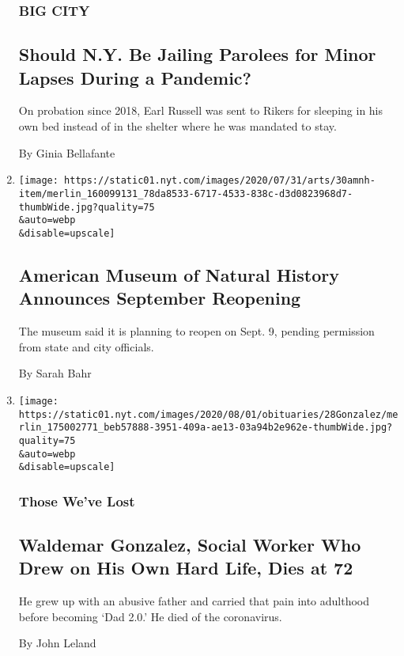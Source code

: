 \begin{enumerate}
  \hypertarget{big-city}{%
  \subsubsection{BIG CITY}\label{big-city}}

  \hypertarget{should-ny-be-jailing-parolees-for-minor-lapses-during-a-pandemic}{%
  \subsection{Should N.Y. Be Jailing Parolees for Minor Lapses During a
  Pandemic?}\label{should-ny-be-jailing-parolees-for-minor-lapses-during-a-pandemic}}

  On probation since 2018, Earl Russell was sent to Rikers for sleeping
  in his own bed instead of in the shelter where he was mandated to
  stay.

  By Ginia Bellafante
\item
  \href{/2020/07/30/arts/design/american-museum-of-natural-history-reopen-covid.html}{}

  \texttt{[image: https://static01.nyt.com/images/2020/07/31/arts/30amnh-item/merlin\_160099131\_78da8533-6717-4533-838c-d3d0823968d7-thumbWide.jpg?quality=75\\\&auto=webp\\\&disable=upscale]}

  \hypertarget{american-museum-of-natural-history-announces-september-reopening}{%
  \subsection{American Museum of Natural History Announces September
  Reopening}\label{american-museum-of-natural-history-announces-september-reopening}}

  The museum said it is planning to reopen on Sept. 9, pending
  permission from state and city officials.

  By Sarah Bahr
\item
  \href{/2020/07/30/obituaries/waldemar-gonzalez-dead-coronavirus.html}{}

  \texttt{[image: https://static01.nyt.com/images/2020/08/01/obituaries/28Gonzalez/merlin\_175002771\_beb57888-3951-409a-ae13-03a94b2e962e-thumbWide.jpg?quality=75\\\&auto=webp\\\&disable=upscale]}

  \hypertarget{those-weve-lost}{%
  \subsubsection{Those We've Lost}\label{those-weve-lost}}

  \hypertarget{waldemar-gonzalez-social-worker-who-drew-on-his-own-hard-life-dies-at-72}{%
  \subsection{Waldemar Gonzalez, Social Worker Who Drew on His Own Hard
  Life, Dies at
  72}\label{waldemar-gonzalez-social-worker-who-drew-on-his-own-hard-life-dies-at-72}}

  He grew up with an abusive father and carried that pain into adulthood
  before becoming `Dad 2.0.' He died of the coronavirus.

  By John Leland
\end{enumerate}

